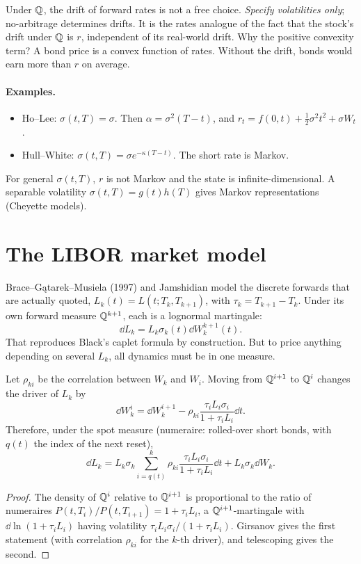 \begin{intuition}
Under $\mathbb{Q}$, the drift of forward rates is not a free choice. \emph{Specify volatilities only}; no-arbitrage determines drifts. It is the rates analogue of the fact that the stock's drift under $\mathbb{Q}$ is $r$, independent of its real-world drift. Why the positive convexity term? A bond price is a convex function of rates. Without the drift, bonds would earn more than $r$ on average.
\end{intuition}

\paragraph{Examples.}
\begin{itemize}
\item Ho--Lee: $\sigma(t,T)=\sigma$. Then $\alpha=\sigma^2(T-t)$, and $r_t=f(0,t)+\tfrac12\sigma^2t^2+\sigma W_t$.
\item Hull--White: $\sigma(t,T)=\sigma e^{-\kappa(T-t)}$. The short rate is Markov.
\end{itemize}
For general $\sigma(t,T)$, $r$ is not Markov and the state is infinite-dimensional. A separable volatility $\sigma(t,T)=g(t)h(T)$ gives Markov representations (Cheyette models).

\section{The LIBOR market model}

Brace--G{\k{a}}tarek--Musiela (1997) and Jamshidian model the discrete forwards that are actually quoted, $L_k(t)=L(t;T_k,T_{k+1})$, with $\tau_k=T_{k+1}-T_k$. Under its own forward measure $\mathbb{Q}^{k+1}$, each is a lognormal martingale:
\[
\dd L_k=L_k\sigma_k(t)\dd W^{k+1}_k(t).
\]
That reproduces Black's caplet formula by construction. But to price anything depending on several $L_k$, all dynamics must be in one measure.

\begin{proposition}
Let $\rho_{ki}$ be the correlation between $W_k$ and $W_i$. Moving from $\mathbb{Q}^{i+1}$ to $\mathbb{Q}^{i}$ changes the driver of $L_k$ by
\[
\dd W_k^{i}=\dd W_k^{i+1}-\rho_{ki}\frac{\tau_iL_i\sigma_i}{1+\tau_iL_i}\dd t.
\]
Therefore, under the spot measure (numeraire: rolled-over short bonds, with $q(t)$ the index of the next reset),
\[
\dd L_k=L_k\sigma_k\sum_{i=q(t)}^{k}\rho_{ki}\frac{\tau_iL_i\sigma_i}{1+\tau_iL_i}\dd t+L_k\sigma_k\dd W_k.
\]
\end{proposition}
\begin{proof}
The density of $\mathbb{Q}^{i}$ relative to $\mathbb{Q}^{i+1}$ is proportional to the ratio of numeraires $P(t,T_i)/P(t,T_{i+1})=1+\tau_iL_i$, a $\mathbb{Q}^{i+1}$-martingale with $\dd\ln(1+\tau_iL_i)$ having volatility $\tau_iL_i\sigma_i/(1+\tau_iL_i)$. Girsanov gives the first statement (with correlation $\rho_{ki}$ for the $k$-th driver), and telescoping gives the second.
\end{proof}

